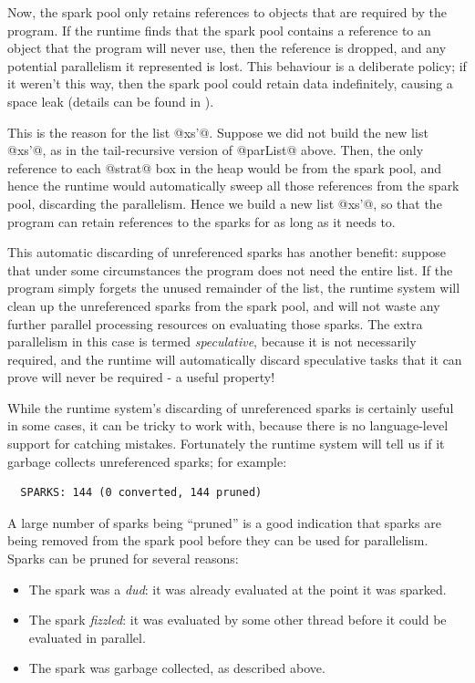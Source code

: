 Now, the spark pool only retains references to objects that are
required by the program.  If the runtime finds that the spark pool
contains a reference to an object that the program will never use,
then the reference is dropped, and any potential parallelism it
represented is lost.  This behaviour is a deliberate policy; if it
weren't this way, then the spark pool could retain data indefinitely,
causing a space leak (details can be found in \citet{seq-no-more}).

This is the reason for the list @xs'@.  Suppose we did not build the
new list @xs'@, as in the tail-recursive version of @parList@ above.
Then, the only reference to each @strat@ box in the heap would be from the
spark pool, and hence the runtime would automatically sweep all those
references from the spark pool, discarding the parallelism.  Hence we
build a new list @xs'@, so that the program can retain references to
the sparks for as long as it needs to.

This automatic discarding of unreferenced sparks has another benefit: suppose that under some
circumstances the program does not need the entire list.  If the
program simply forgets the unused remainder of the list, the runtime
system will clean up the unreferenced sparks from the spark pool, and
will not waste any further parallel processing resources on evaluating
those sparks.  The extra parallelism in this case is termed
\emph{speculative}, because it is not necessarily required, and the
runtime will automatically discard speculative tasks that it can prove
will never be required - a useful property!

While the runtime system's discarding of unreferenced sparks is
certainly useful in some cases, it can be tricky to work with, because
there is no language-level support for catching mistakes.  Fortunately
the runtime system will tell us if it garbage collects unreferenced
sparks; for example:

{\small \begin{verbatim}
  SPARKS: 144 (0 converted, 144 pruned)
\end{verbatim}}

\noindent A large number of sparks being ``pruned'' is a good
indication that sparks are being removed from the spark pool before
they can be used for parallelism.  Sparks can be pruned for several
reasons:

\begin{itemize}
\item The spark was a \emph{dud}: it was already evaluated at the
  point it was sparked.
\item The spark \emph{fizzled}: it was evaluated by some other thread
  before it could be evaluated in parallel.
\item The spark was garbage collected, as described above.
\end{itemize}

